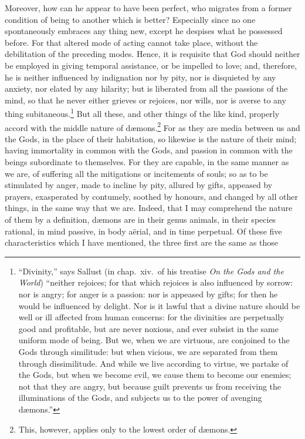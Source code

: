 \documentclass[twoside]{article}
\begin{document}
Moreover, how can he appear to have been perfect, who migrates from a former
condition of being to another which is better? Especially since no one
spontaneously embraces any thing new, except he despises what he possessed
before. For that altered mode of acting cannot take place, without the
debilitation of the preceding modes. Hence, it is requisite that God should
neither be employed in giving temporal assistance, or be impelled to love; and,
therefore, he is neither influenced by indignation nor by pity, nor is
disquieted by any anxiety, nor elated by any hilarity; but is liberated from
all the passions of the mind, so that he never either grieves or rejoices, nor
wills, nor is averse to any thing subitaneous.\footnote{``Divinity,'' says
Sallust (in chap.~xiv.~of his treatise \textit{On the Gods and the World})
``neither rejoices; for that which rejoices is also influenced by sorrow: nor
is angry; for anger is a passion: nor is appeased by gifts; for then he would
be influenced by delight. Nor is it lawful that a divine nature should be well
or ill affected from human concerns: for the divinities are perpetually good
and profitable, but are never noxious, and ever subsist in the same uniform
mode of being. But we, when we are virtuous, are conjoined to the Gods through
similitude: but when vicious, we are separated from them through dissimilitude.
And while we live according to virtue, we partake of the Gods, but when we
become evil, we cause them to become our enemies; not that they are angry, but
because guilt prevents us from receiving the illuminations of the Gods, and
subjects us to the power of avenging d{\ae}mons.''} But all these, and other
things of the like kind, properly accord with the middle nature of
d{\ae}mons.\footnote{This, however, applies only to the lowest order of
d{\ae}mons.} For as they are media between us and the Gods, in the place of
their habitation, so likewise is the nature of their mind; having immortality
in common with the Gods, and passion in common with the beings subordinate to
themselves.  For they are capable, in the same manner as we are, of suffering
all the mitigations or incitements of souls; so as to be stimulated by anger,
made to incline by pity, allured by gifts, appeased by prayers, exasperated by
contumely, soothed by honours, and changed by all other things, in the same way
that we are. Indeed, that I may comprehend the nature of them by a definition,
d{\ae}mons are in their genus animals, in their species rational, in mind
passive, in body a\"{e}rial, and in time perpetual. Of these five
characteristics which I have mentioned, the three first are the same as those
\end{document}
